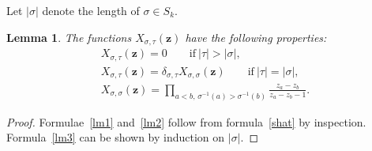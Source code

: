 \documentclass[10pt,a4paper]{amsart}
\numberwithin{equation}{section}
\newtheorem{Lemma}[Theorem]{Lemma}
\begin{document}
Let $|\sigma|$ denote the length of $\sigma\in S_k$.
\begin{Lemma} \label{longperm} The functions $X_{\sigma,\tau}(\boldsymbol{z})$ have the following properties:
\begin{gather}\label{lm1}
X_{\sigma,\tau}(\boldsymbol{z})=0 \qquad \text{if} \ |\tau|>|\sigma|,
\\ \label{lm2}
X_{\sigma,\tau}(\boldsymbol{z})=\delta_{\sigma,\tau} X_{\sigma,\sigma}(\boldsymbol{z})
\qquad \text{if} \ |\tau|=|\sigma|,
\\ \label{lm3}
X_{\sigma,\sigma}(\boldsymbol{z})=\prod_{a<b,\,\sigma^{-1}(a)>\sigma^{-1}(b)}\frac{z_a-z_b}{z_a-z_b-1}.
\end{gather}
\end{Lemma}
\begin{proof}
Formulae~\eqref{lm1} and~\eqref{lm2} follow from formula~\eqref{shat} by inspection. Formula~\eqref{lm3} can be shown by induction on $|\sigma|$.
\end{proof}
\end{document}
